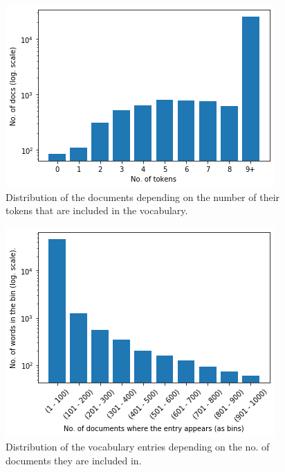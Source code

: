 \begin{figure}
    \centering
    \includegraphics[width=.7\textwidth]{figures/unsupervised_approach/bow_data.png}
    \caption{Distribution of the documents depending on the number of their tokens that are included in the vocabulary.}
    \label{fig:bow_data}
\end{figure}

\begin{figure}
    \centering
    \includegraphics[width=.7\textwidth]{figures/vocab/vocab_1grams.png}
    \caption{Distribution of the vocabulary entries depending on the no. of documents they are included in.}
    \label{fig:vocab_1grams}
\end{figure}